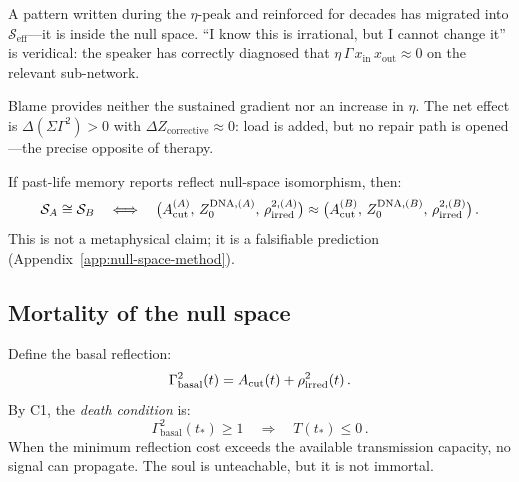 \documentclass[aps,pre,twocolumn,superscriptaddress,floatfix]{revtex4-2}
\begin{document}
\begin{remark}
\label{rem:fixation}
A pattern written during the $\eta$-peak and reinforced
for decades has migrated into
$\mathcal{S}_{\text{eff}}$---it is inside the null space.
``I know this is irrational, but I cannot change it''
is veridical: the speaker has correctly diagnosed that
$\eta\,\Gamma\,x_{\text{in}}\,x_{\text{out}}\approx 0$
on the relevant sub-network.
\end{remark}

\begin{remark}
\label{rem:secondary-injury}
Blame provides neither the sustained gradient nor an increase
in $\eta$.
The net effect is $\Delta(\Sigma\Gamma^2) > 0$ with
$\Delta Z_{\text{corrective}} \approx 0$: load is
added, but no repair path is opened---the precise
opposite of therapy.
\end{remark}

\begin{remark}
If past-life memory reports reflect null-space isomorphism,
then:
\begin{equation}
  \mathcal{S}_A \cong \mathcal{S}_B
  \quad\Longleftrightarrow\quad
  \bigl(A_{\text{cut}}^{(A)},\, Z_0^{\text{DNA},(A)},\,
    \rho_{\text{irred}}^{2,(A)}\bigr)
  \approx
  \bigl(A_{\text{cut}}^{(B)},\, Z_0^{\text{DNA},(B)},\,
    \rho_{\text{irred}}^{2,(B)}\bigr)\,.
  \label{eq:null-space-isomorphism}
\end{equation}
This is not a metaphysical claim; it is a falsifiable
prediction (Appendix~\ref{app:null-space-method}).
\end{remark}

\subsection{Mortality of the null space}
\label{sec:null-space-mortality}

Define the basal reflection:
\begin{equation}
  \Gamma_{\text{basal}}^2(t)
    = A_{\text{cut}}(t) + \rho_{\text{irred}}^2(t)\,.
  \label{eq:basal-reflection}
\end{equation}
By C1, the \emph{death condition} is:
\begin{equation}
  \boxed{\;
  \Gamma_{\text{basal}}^2(t_*) \ge 1
  \quad\Longrightarrow\quad
  T(t_*) \le 0\,.
  \;}
  \label{eq:death-condition}
\end{equation}
When the minimum reflection cost exceeds the available
transmission capacity, no signal can propagate.
The soul is unteachable, but it is not immortal.
\end{document}
